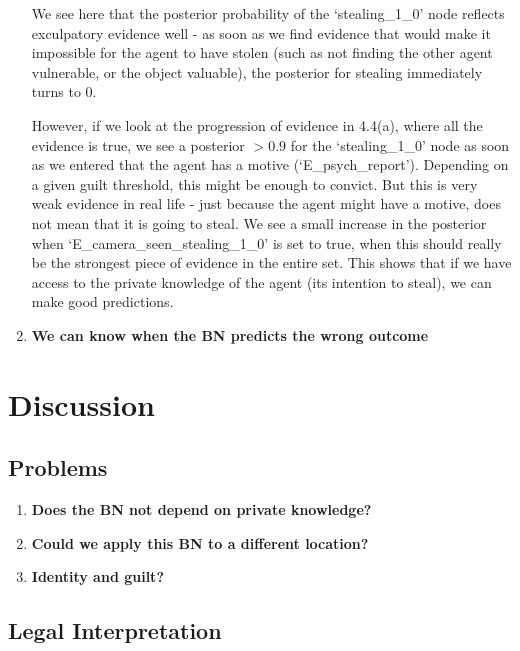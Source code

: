 \begin{enumerate}
We see here that the posterior probability of the `stealing\_1\_0' node reflects exculpatory evidence well - as soon as we find evidence that would make it impossible for the agent to have stolen (such as not finding the other agent vulnerable, or the object valuable), the posterior for stealing immediately turns to 0. 

However, if we look at the progression of evidence in 4.4(a), where all the evidence is true, we see a posterior $>0.9$ for the `stealing\_1\_0' node as soon as we entered that the agent has a motive (`E\_psych\_report'). Depending on a given guilt threshold, this might be enough to convict. But this is very weak evidence in real life - just because the agent might have a motive, does not mean that it is going to steal. We see a small increase in the posterior when `E\_camera\_seen\_stealing\_1\_0' is set to true, when this should really be the strongest piece of evidence in the entire set. This shows that if we have access to the private knowledge of the agent (its intention to steal), we can make good predictions.


\item \textbf{We can know when the BN predicts the wrong outcome}
\end{enumerate}

\section{Discussion}


\subsection{Problems}
\begin{enumerate}
\item \textbf{Does the BN not depend on private knowledge?}
\item \textbf{Could we apply this BN to a different location? }
\item \textbf{Identity and guilt?}

\end{enumerate}


\subsection{Legal Interpretation}



